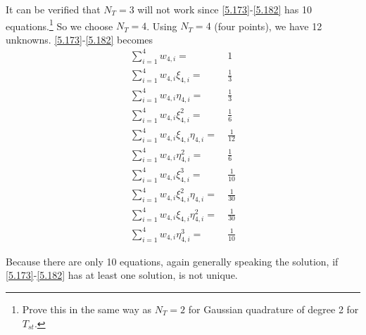 \documentclass[a4paper]{article}
\numberwithin{equation}{section}
\begin{document}
It can be verified that $N_T=3$ will not work since \eqref{5.173}-\eqref{5.182} has 10 equations.\footnote{Prove this in the same way as $N_T=2$ for Gaussian quadrature of degree 2 for $T_{st}$.} So we choose $N_T=4$. Using $N_T=4$ (four points), we have 12 unknowns. \eqref{5.173}-\eqref{5.182} becomes
\begin{align}
\label{5.183}
\sum\limits_{i = 1}^4 {{w_{4,i}}}  =&\ 1\\
\sum\limits_{i = 1}^4 {{w_{4,i}}{\xi _{4,i}}}  =&\ \frac{1}{3}\\
\sum\limits_{i = 1}^4 {{w_{4,i}}{\eta _{4,i}}}  =&\ \frac{1}{3}\\
\sum\limits_{i = 1}^4 {{w_{4,i}}\xi _{4,i}^2} =&\ \frac{1}{6}\\
\sum\limits_{i = 1}^4 {{w_{4,i}}{\xi _{4,i}}{\eta _{4,i}}}  =&\ \frac{1}{{12}}\\
\sum\limits_{i = 1}^4 {{w_{4,i}}\eta _{4,i}^2}  =&\ \frac{1}{6}\\
\sum\limits_{i = 1}^4 {{w_{4,i}}\xi _{4,i}^3} =&\ \frac{1}{{10}}\\
\sum\limits_{i = 1}^4 {{w_{4,i}}\xi _{4,i}^2{\eta _{4,i}}}  =&\ \frac{1}{{30}}\\
\sum\limits_{i = 1}^4 {{w_{4,i}}{\xi _{4,i}}\eta _{4,i}^2} =&\ \frac{1}{{30}}\\
\sum\limits_{i = 1}^4 {{w_{4,i}}\eta _{4,i}^3}  =&\ \frac{1}{{10}} \label{5.192}
\end{align}

Because there are only 10 equations, again generally speaking the solution, if \eqref{5.173}-\eqref{5.182} has at least one solution, is not unique.
\end{document}
